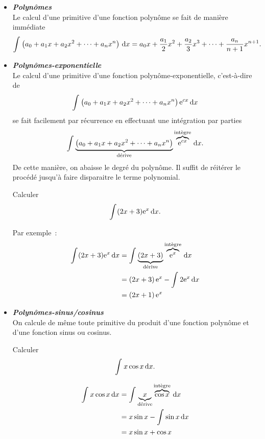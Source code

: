 \documentclass{magnoliaold}
\begin{document}
\begin{itemize}
\item \emph{\bf Polynômes}\\
  Le calcul d'une primitive d'une fonction polynôme se fait de manière
  immédiate
  $$\int_{}^{} \left(a_0+a_1 x+a_2 x^2+\dots+a_n x^n\right)\,\text{d}x=
    a_0 x+\frac{a_1}{2}x^2+\frac{a_2}{3}x^3+\dots+\frac{a_n}{n+1}x^{n+1}.$$
\item \emph{\bf Polynômes-exponentielle}\\
  Le calcul d'une primitive d'une fonction polynôme-exponentielle,
  c'est-à-dire de
  $$\int_{}^{} \left(a_0+a_1 x+a_2 x^2+\dots+a_n x^n\right){\rm e}^{cx}\,\text{d}x$$
  se fait facilement par récurrence en effectuant une intégration par
  parties
  $$\int_{}^{} \underbrace{\left(a_0+a_1 x+a_2 x^2+\dots+a_n x^n\right)}_{\text{d\'erive}} \overbrace{{\rm e}^{cx}}^{\text{int\`egre}}\,\text{d}x.$$
  De cette manière, on abaisse le degré du polynôme. Il suffit de réitérer
  le procédé jusqu'à faire disparaitre le terme polynomial.
  \begin{exoUnique}
  \exo Calculer
    \[\int_{}^{} (2x+3){\rm e}^x\,\text{d}x.\]
    \begin{sol}
  Par exemple~:
  \begin{equation*}
  \begin{split}
  \int_{}^{} (2x+3){\rm e}^x\,\text{d}x&=\int_{}^{} \underbrace{\left(2x+3\right)}_{\text{d\'erive}} \overbrace{{\rm e}^x}^{\text{int\`egre}}\,\text{d}x\\
                     &=\left(2x+3\right){\rm e}^x-\int_{}^{} 2{\rm e}^x\,\text{d}x\\
                     &=\left(2x+1\right){\rm e}^x
  \end{split}
  \end{equation*}
    \end{sol}
  \end{exoUnique}
\item \emph{\bf Polynômes-sinus/cosinus}\\
  On calcule de même toute primitive du produit d'une fonction polynôme
  et d'une fonction sinus ou cosinus.
  \begin{exoUnique}
  \exo Calculer
    \[\int_{}^{} x\cos x\,\text{d}x.\]
    \begin{sol}
  \begin{equation*}
  \begin{split}
  \int_{}^{} x\cos x\,\text{d}x&=\int_{}^{} \underbrace{x}_{\text{d\'erive}} \overbrace{\cos x}^{\text{int\`egre}}\,\text{d}x\\
                   &=x\sin x-\int_{}^{} \sin x\,\text{d}x\\
                   &=x\sin x+\cos x    
  \end{split}
  \end{equation*}
    \end{sol}
  \end{exoUnique}

\end{itemize}
\end{document}
